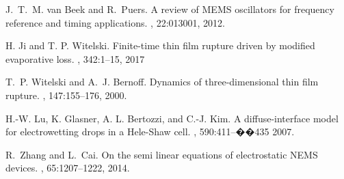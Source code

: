 \documentclass{siamart0516}
\theoremstyle{plain}%
\theoremstyle{definition}
\theoremstyle{remark}
\begin{document}
\begin{thebibliography}{10}
J.~T.~M. van Beek and R.~Puers.
\newblock A review of {MEMS} oscillators for frequency reference and timing
  applications.
, 22:013001, 2012.

 H. Ji and T. P. Witelski.
\newblock Finite-time thin film rupture driven by modified evaporative loss.
, 342:1--15, 2017

T.~P. Witelski and A.~J. Bernoff.
\newblock Dynamics of three-dimensional thin film rupture.
, 147:155--176, 2000.

H.-W. Lu,  K. Glasner, A. L. Bertozzi, and C.-J. Kim.
\newblock A diffuse-interface model for electrowetting drops in a {H}ele-{S}haw cell.
, 590:411--��435 2007.


R.~Zhang and L.~Cai.
\newblock On the semi linear equations of electrostatic {NEMS} devices.
, 65:1207--1222, 2014.

\end{thebibliography}


\end{document}

